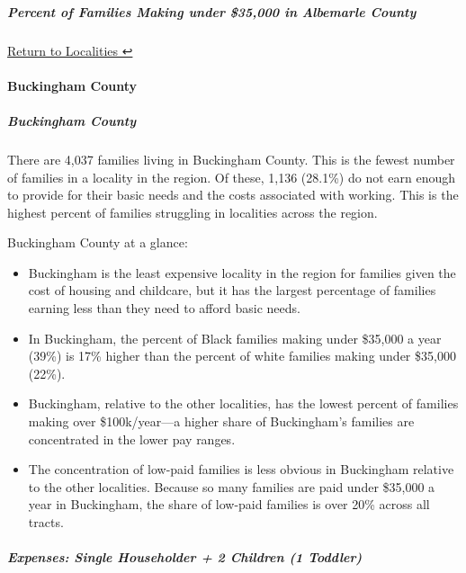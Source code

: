 \documentclass[
]{article}
\begin{document}
\hypertarget{percent-of-families-making-under-35000-in-albemarle-county}{%
\subparagraph{Percent of Families Making under \$35,000 in Albemarle
County}\label{percent-of-families-making-under-35000-in-albemarle-county}}

\protect\hyperlink{localities}{Return to Localities ↩︎}

\hypertarget{buckingham-county}{%
\paragraph{Buckingham County}\label{buckingham-county}}

\hypertarget{buckingham-county-1}{%
\subparagraph{Buckingham County}\label{buckingham-county-1}}

There are 4,037 families living in Buckingham County. This is the fewest
number of families in a locality in the region. Of these, 1,136 (28.1\%)
do not earn enough to provide for their basic needs and the costs
associated with working. This is the highest percent of families
struggling in localities across the region.

Buckingham County at a glance:

\begin{itemize}
\item
  Buckingham is the least expensive locality in the region for families
  given the cost of housing and childcare, but it has the largest
  percentage of families earning less than they need to afford basic
  needs.
\item
  In Buckingham, the percent of Black families making under \$35,000 a
  year (39\%) is 17\% higher than the percent of white families making
  under \$35,000 (22\%).
\item
  Buckingham, relative to the other localities, has the lowest percent
  of families making over \$100k/year---a higher share of Buckingham's
  families are concentrated in the lower pay ranges.
\item
  The concentration of low-paid families is less obvious in Buckingham
  relative to the other localities. Because so many families are paid
  under \$35,000 a year in Buckingham, the share of low-paid families is
  over 20\% across all tracts.
\end{itemize}

\hypertarget{expenses-single-householder-2-children-1-toddler-1}{%
\subparagraph{Expenses: Single Householder + 2 Children (1
Toddler)}\label{expenses-single-householder-2-children-1-toddler-1}}
\end{document}
